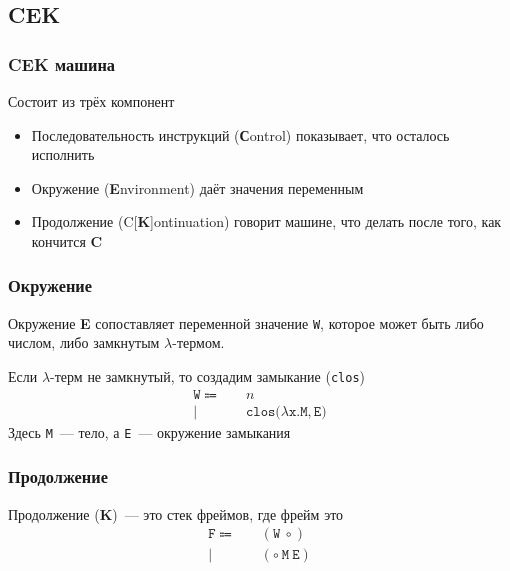 \subsection{CEK}

\begin{frame}
  \frametitle{CEK машина}
  Состоит из трёх компонент
  \begin{itemize}
    \item Последовательность инструкций (\textbf{С}ontrol) показывает, что осталось исполнить
    \item Окружение (\textbf{E}nvironment) даёт значения переменным
    \item Продолжение (C[\textbf{K}]ontinuation) говорит машине, что делать после того, как кончится \textbf{C}
  \end{itemize}
\end{frame}



\begin{frame}
  \frametitle{Окружение}
  Окружение \textbf{E} сопоставляет переменной значение \texttt{W}, которое может быть либо числом, либо замкнутым $\lambda$-термом.

  Если $\lambda$-терм не замкнутый, то создадим замыкание (\texttt{clos})
  \begin{align*}
    \mathtt{W} \Coloneqq & \quad n                              \\
    \mid                 & \quad \mathtt{clos(\lambda x. M, E})
  \end{align*}
  Здесь \texttt{M}~--- тело, а  \texttt{E}~--- окружение замыкания
\end{frame}

\begin{frame}
  \frametitle{Продолжение}
  Продолжение (\textbf{K})~--- это стек фреймов, где фрейм это
  \begin{align*}
    \mathtt{F}  \Coloneqq & \quad (\mathtt{W} \ \circ)             \\
    \mid                  & \quad(\circ \ \mathtt{M} \ \mathtt{E})
  \end{align*}
\end{frame}

